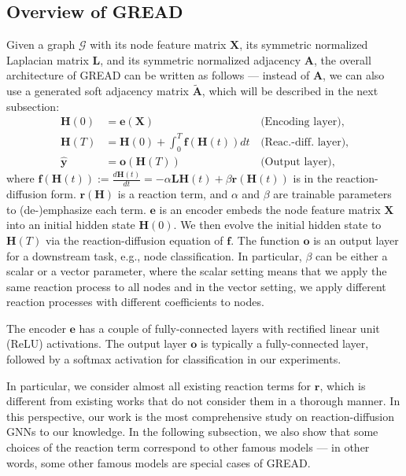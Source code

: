 \documentclass{article}
\theoremstyle{plain}
\theoremstyle{definition}
\theoremstyle{remark}
\begin{document}
\subsection{Overview of GREAD}
Given a graph $\mathcal{G}$ with its node feature matrix $\mathbf{X}$, its symmetric normalized Laplacian matrix $\mathbf{L}$, and its symmetric normalized adjacency $\mathbf{A}$, the overall architecture of GREAD can be written as follows --- instead of $\mathbf{A}$, we can also use a generated soft adjacency matrix $\tilde{\mathbf{A}}$, which will be described in the next subsection:
\begingroup\makeatletter\def\f@size{9}\check@mathfonts
\def\maketag@@@#1{\hbox{\m@th\small\normalfont#1}}\begin{align}
    \mathbf{H}(0) &= \mathbf{e}(\mathbf{X})\, &\textrm{(Encoding layer),}\label{eq:end}\\
    \mathbf{H}(T) &= \mathbf{H}(0) + \int_0^T \mathbf{f}(\mathbf{H}(t))dt\, &\textrm{(Reac.-diff. layer),}\label{eq:rd}\\
    \hat{\mathbf{y}} &= \mathbf{o}(\mathbf{H}(T))\, &\textrm{(Output layer)},\label{eq:out}
\end{align}\endgroup where $\mathbf{f}(\mathbf{H}(t)) := \frac{d \mathbf{H}(t)}{dt} = -\alpha\mathbf{L}\mathbf{H}(t) + \beta\mathbf{r}(\mathbf{H}(t))$ is in the reaction-diffusion form. $\mathbf{r}(\mathbf{H})$ is a reaction term, and $\alpha$ and $\beta$ are trainable parameters to (de-)emphasize each term. $\mathbf{e}$ is an encoder embeds the node feature matrix $\mathbf{X}$ into an initial hidden state $\mathbf{H}(0)$. We then evolve the initial hidden state to $\mathbf{H}(T)$ via the reaction-diffusion equation of $\mathbf{f}$. The function $\mathbf{o}$ is an output layer for a downstream task, e.g., node classification. In particular, $\beta$ can be either a scalar or a vector parameter, where the scalar setting means that we apply the same reaction process to all nodes and in the vector setting, we apply different reaction processes with different coefficients to nodes.

The encoder $\mathbf{e}$ has a couple of fully-connected layers with rectified linear unit (ReLU) activations. The output layer $\mathbf{o}$ is typically a fully-connected layer, followed by a softmax activation for classification in our experiments.

In particular, we consider almost all existing reaction terms for $\mathbf{r}$, which is different from existing works that do not consider them in a thorough manner. In this perspective, our work is the most comprehensive study on reaction-diffusion GNNs to our knowledge. In the following subsection, we also show that some choices of the reaction term correspond to other famous models --- in other words, some other famous models are special cases of GREAD.
\end{document}
